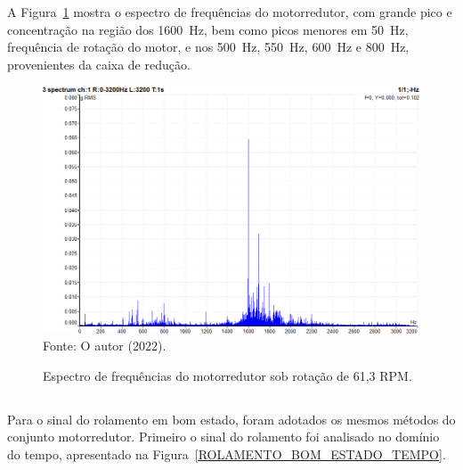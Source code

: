 \documentclass[
	12pt,				
	oneside,			
	a4paper,			
	english,			
	brazil,			
	]{abntex2ppgsi}
\begin{document}
A Figura~\ref{ESPECTRO_ACELERACAO_MOTORREDUTOR_100HZ} mostra o espectro de frequências do motorredutor, com grande pico e concentração na região dos \SI{1600}{\hertz}, bem como picos menores em \SI{50}{\hertz}, frequência de rotação do motor, e nos \SI{500}{\hertz}, \SI{550}{\hertz}, \SI{600}{\hertz} e \SI{800}{\hertz}, provenientes da caixa de redução. 

\begin{figure}[H]
\centering
\caption {Espectro de frequências do motorredutor sob rotação de 61,3 RPM.}
\includegraphics[width=\textwidth,keepaspectratio]{ESPECTRO_ACELERACAO_MOTORREDUTOR_100HZ} \\
Fonte: O autor (2022).
\label{ESPECTRO_ACELERACAO_MOTORREDUTOR_100HZ}
\end{figure}

\subsection{}

Para o sinal do rolamento em bom estado, foram adotados os mesmos métodos do conjunto motorredutor. Primeiro o sinal do rolamento foi analisado no domínio do tempo, apresentado na Figura~\ref{ROLAMENTO_BOM_ESTADO_TEMPO}.
\end{document}
